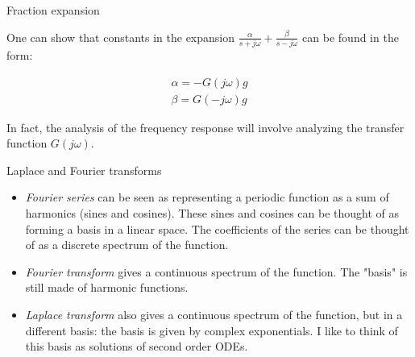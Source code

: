 \documentclass{beamer}
\begin{document}
\begin{frame}{Fraction expansion}
	\begin{flushleft}
		
		One can show that constants in the expansion $\frac{\alpha}{s + j\omega} + \frac{\beta}{s - j\omega}$ can be found in the form:
		
		\begin{align}
			\alpha = -G(j\omega) g
			\\
			\beta = G(-j\omega) g
		\end{align}
	
		\bigskip
	
		In fact, the analysis of the frequency response will involve analyzing the transfer function $G(j\omega)$.
		
	\end{flushleft}
\end{frame}






\begin{frame}{Laplace and Fourier transforms}
\begin{flushleft}

\begin{itemize}
    \item \emph{Fourier series} can be seen as representing a periodic function as a sum of harmonics (sines and cosines). These sines and cosines can be thought of as forming a basis in a linear space. The coefficients of the series can be thought of as a discrete spectrum of the function.
    
    \item \emph{Fourier transform} gives a continuous spectrum of the function. The "basis" is still made of harmonic functions.
    
    \item \emph{Laplace transform} also gives a continuous spectrum of the function, but in a different basis: the basis is given by complex exponentials. I like to think of this basis as solutions of second order ODEs.
\end{itemize}

\end{flushleft}
\end{frame}
\end{document}
